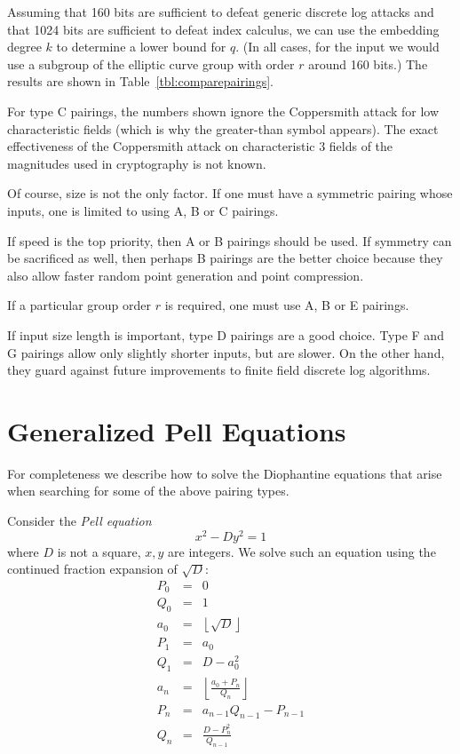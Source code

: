 Assuming that 160 bits are sufficient to defeat generic discrete log attacks
and that 1024 bits are sufficient to defeat index calculus, we can use
the embedding degree $k$ to determine a lower bound for $q$.
(In all cases,
for the input we would use a subgroup of the elliptic curve group
with order $r$ around 160 bits.)
The results are shown in Table~\ref{tbl:comparepairings}.

For type C pairings, the numbers shown ignore the Coppersmith attack
for low characteristic fields (which is why the greater-than symbol appears).
The exact effectiveness of the Coppersmith attack on characteristic 3 fields
of the magnitudes used in cryptography is not known.

Of course, size is not the only factor. If one must have
a symmetric pairing whose inputs, one is limited to using A, B or C pairings.

If speed is the top priority, then A or B pairings should be used. If symmetry
can be sacrificed as well, then perhaps B pairings are the better choice because
they also allow faster random point generation and point compression.

If a particular group order $r$ is required, one must use A, B or E pairings.

If input size length is important, type D pairings are a good choice.
Type F and G pairings allow only slightly shorter inputs, but are slower.
On the other hand, they guard against future improvements to
finite field discrete log algorithms.

\section {Generalized Pell Equations}

For completeness we describe how to solve the Diophantine equations that arise
when searching for some of the above pairing types.

Consider the \emph{Pell equation}
\[ x^2 - D y^2 = 1 \]
where $D$ is not a square, $x, y$ are integers.
We solve such an equation using the
continued fraction expansion of $\sqrt{D}$:
\[
\begin{array}{rcl}
P_0 &=& 0 \\
Q_0 &=& 1 \\
a_0 &=& \left\lfloor{\sqrt{D}}\right\rfloor \\
P_1 &=& a_0 \\
Q_1 &=& D-a_0^2 \\
a_n &=& \left\lfloor { \frac {a_0 + P_n}{Q_n} } \right\rfloor \\
P_n &=& a_{n-1} Q_{n-1} - P_{n-1} \\
Q_n &=& \frac{D - P_n^2}{Q_{n-1}}
\end{array}
\]

